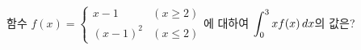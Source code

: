 함수 $f(x)=\begin{cases} x-1 & (x\ge 2) \\ (x-1)^2 & (x\le 2) \end{cases}$에 대하여 $\displaystyle\int_{0}^{3}xf(x)\mkern3mu dx$의 값은?
